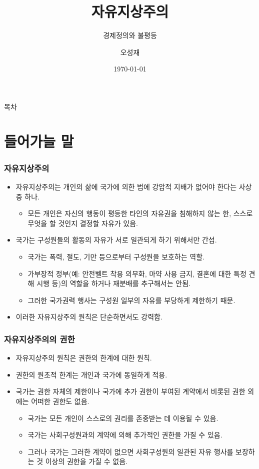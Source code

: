 \documentclass[aspectratio=169,xcolor=dvipsnames,handout]{beamer}
\title[자유지상주의]{자유지상주의} %
\subtitle{경제정의와 불평등}
\author[오성재]{오성재}
\institute[HNU] %
{
    한남대학교 \\
    탈메이지 교양학부 \\
}
\date{\today} %
\begin{document}
\begin{frame}
    \titlepage
\end{frame}

\begin{frame}{목차}
    \tableofcontents
\end{frame}

\section{들어가늘 말}

\begin{frame}[<+->]
\frametitle{자유지상주의}
    \begin{itemize}
        \item 자유지상주의는 개인의 삶에 국가에 의한 법에 강압적 지배가 없어야 한다는 사상 중 하나.
        \begin{itemize}
            \item 모든 개인은 자신의 행동이 평등한 타인의 자유권을 침해하지 않는 한, 스스로 무엇을 할 것인지 결정할 자유가 있음.
        \end{itemize}
    \item 국가는 구성원들의 활동의 자유가 서로 일관되게 하기 위해서만 간섭.
        \begin{itemize}
        \item 국가는 폭력, 절도, 기만 등으로부터 구성원을 보호하는 역할.
        \item 가부장적 정부(예: 안전벨트 착용 의무화, 마약 사용 금지, 결혼에 대한 특정 견해 시행 등)의 역할을 하거나 재분배를 추구해서는 안됨.
        \item 그러한 국가권력 행사는 구성원 일부의 자유를 부당하게 제한하기 때문.
        \end{itemize}
    \item 이러한 자유지상주의 원칙은 단순하면서도 강력함.
    \end{itemize}
\end{frame}

\begin{frame}[<+->]
\frametitle{자유지상주의의 권한}
    \begin{itemize}
        \item 자유지상주의 원칙은 권한의 한계에 대한 원칙.
        \item 권한의 원초적 한계는 개인과 국가에 동일하게 적용.
        \item 국가는 권한 자체의 제한이나 국가에 추가 권한이 부여된 계약에서 비롯된 권한 외에는 어떠한 권한도 없음.
        \begin{itemize}
            \item 국가는 모든 개인이 스스로의 권리를 존중받는 데 이용될 수 있음.
            \item 국가는 사회구성원과의 계약에 의해 추가적인 권한을 가질 수 있음.
            \item 그러나 국가는 그러한 계약이 없으면 사회구성원의 일관된 자유 행사를 보장하는 것 이상의 권한을 가질 수 없음.
        \end{itemize}
    \end{itemize}
\end{frame}
\end{document}
